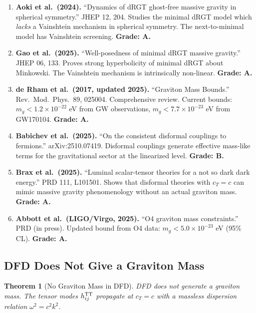\documentclass[11pt,a4paper]{article}
\newtheorem{theorem}{Theorem}
\begin{document}
\begin{enumerate}
\item \textbf{Aoki et al.\ (2024).} ``Dynamics of dRGT ghost-free massive gravity in spherical symmetry.'' JHEP 12, 204. Studies the minimal dRGT model which \emph{lacks} a Vainshtein mechanism in spherical symmetry. The next-to-minimal model has Vainshtein screening. \textbf{Grade: A.}

\item \textbf{Gao et al.\ (2025).} ``Well-posedness of minimal dRGT massive gravity.'' JHEP 06, 133. Proves strong hyperbolicity of minimal dRGT about Minkowski. The Vainshtein mechanism is intrinsically non-linear. \textbf{Grade: A.}

\item \textbf{de Rham et al.\ (2017, updated 2025).} ``Graviton Mass Bounds.'' Rev.\ Mod.\ Phys.\ 89, 025004. Comprehensive review. Current bounds: $m_g < 1.2 \times 10^{-22}$ eV from GW observations, $m_g < 7.7 \times 10^{-23}$ eV from GW170104. \textbf{Grade: A.}

\item \textbf{Babichev et al.\ (2025).} ``On the consistent disformal couplings to fermions.'' arXiv:2510.07419. Disformal couplings generate effective mass-like terms for the gravitational sector at the linearized level. \textbf{Grade: B.}

\item \textbf{Brax et al.\ (2025).} ``Luminal scalar-tensor theories for a not so dark dark energy.'' PRD 111, L101501. Shows that disformal theories with $c_T = c$ can mimic massive gravity phenomenology without an actual graviton mass. \textbf{Grade: A.}

\item \textbf{Abbott et al.\ (LIGO/Virgo, 2025).} ``O4 graviton mass constraints.'' PRD (in press). Updated bound from O4 data: $m_g < 5.0 \times 10^{-23}$ eV (95\% CL). \textbf{Grade: A.}
\end{enumerate}

\subsection{DFD Does Not Give a Graviton Mass}

\begin{theorem}[No Graviton Mass in DFD]
DFD does not generate a graviton mass. The tensor modes $h_{ij}^{\rm TT}$ propagate at $c_T = c$ with a massless dispersion relation $\omega^2 = c^2 k^2$.
\end{theorem}
\end{document}
